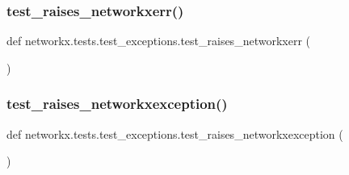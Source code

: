 \subsubsection{\texorpdfstring{test\+\_\+raises\+\_\+networkxerr()}{test\_raises\_networkxerr()}}
{\footnotesize\ttfamily def networkx.\+tests.\+test\+\_\+exceptions.\+test\+\_\+raises\+\_\+networkxerr (\begin{DoxyParamCaption}{ }\end{DoxyParamCaption})}

\mbox{\label{namespacenetworkx_1_1tests_1_1test__exceptions_a3899a490542c69a90b205bf33e623ec0}} 
\subsubsection{\texorpdfstring{test\+\_\+raises\+\_\+networkxexception()}{test\_raises\_networkxexception()}}
{\footnotesize\ttfamily def networkx.\+tests.\+test\+\_\+exceptions.\+test\+\_\+raises\+\_\+networkxexception (\begin{DoxyParamCaption}{ }\end{DoxyParamCaption})}

